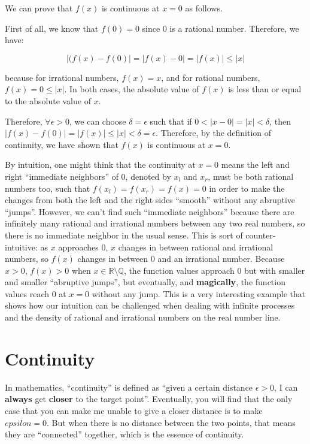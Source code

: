 \documentclass[12pt, letterpaper, oneside]{article}
\begin{document}
We can prove that $f(x)$ is continuous at \(x = 0\) as follows.

First of all, we know that \(f(0) = 0\) since 0 is a rational number. Therefore, we have:

\[|(f(x) - f(0)| = |f(x) - 0| = |f(x)| \leqslant |x|\]

because for irrational numbers, \(f(x) = x\), and for rational numbers, \(f(x) = 0 \leqslant |x|\). In both cases, the
absolute value of \(f(x)\) is less than or equal to the absolute value of \(x\).

Therefore, $\forall \epsilon > 0$, we can choose $\delta = \epsilon$ such that if $0 < |x - 0| = |x| < \delta$, then
$|f(x) - f(0)| = |f(x)| \leqslant |x| < \delta = \epsilon$. Therefore, by the definition of continuity, we have shown
that $f(x)$ is continuous at \(x = 0\).

By intuition, one might think that the continuity at \(x = 0\) means the left and right ``immediate neighbors'' of 0,
denoted by $x_l$ and $x_r$, must be both rational numbers too, such that $f(x_l) = f(x_r) = f(x) = 0$ in order to make
the changes from both the left and the right sides ``smooth'' without any abruptive ``jumps''. However, we can't find
such ``immediate neighbors'' because there are infinitely many rational and irrational numbers between any two real
numbers, so there is no immediate neighbor in the usual sense. This is sort of counter-intuitive: as $x$ approaches 0,
$x$ changes in between rational and irrational numbers, so $f(x)$ changes in between 0 and an irrational number. Because
$x > 0$, $f(x) > 0$ when $x \in \mathbb{R} \setminus \mathbb{Q}$, the function values approach 0 but with smaller and
smaller ``abruptive jumps'', but eventually, and \textbf{magically}, the function values reach 0 at $x = 0$ without any
jump. This is a very interesting example that shows how our intuition can be challenged when dealing with infinite
processes and the density of rational and irrational numbers on the real number line.

\section{Continuity}

In mathematics, ``continuity'' is defined as ``given a certain distance $\epsilon > 0$, I can \textbf{always} get
\textbf{closer} to the target point''. Eventually, you will find that the only case that you can make me unable to give
a closer distance is to make $epsilon = 0$. But when there is no distance between the two points, that means they are
``connected'' together, which is the essence of continuity.
\end{document}
